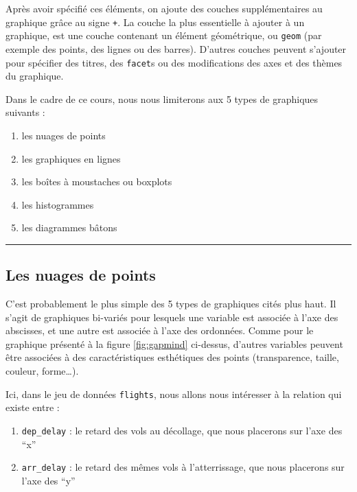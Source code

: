 \documentclass[a4paperpaper,]{article}
\providecommand{\tightlist}{%
  \setlength{\itemsep}{0pt}\setlength{\parskip}{0pt}}
\begin{document}
Après avoir spécifié ces éléments, on ajoute des couches supplémentaires au graphique grâce au signe \texttt{+}. La couche la plus essentielle à ajouter à un graphique, est une couche contenant un élément géométrique, ou \texttt{geom} (par exemple des points, des lignes ou des barres). D'autres couches peuvent s'ajouter pour spécifier des titres, des \texttt{facet}s ou des modifications des axes et des thèmes du graphique.

Dans le cadre de ce cours, nous nous limiterons aux 5 types de graphiques suivants :

\begin{enumerate}
\def\labelenumi{\arabic{enumi}.}
\tightlist
\item
  les nuages de points
\item
  les graphiques en lignes
\item
  les boîtes à moustaches ou boxplots
\item
  les histogrammes
\item
  les diagrammes bâtons
\end{enumerate}

\begin{center}\rule{0.5\linewidth}{\linethickness}\end{center}

\hypertarget{clouds}{%
\subsection{Les nuages de points}\label{clouds}}

C'est probablement le plus simple des 5 types de graphiques cités plus haut. Il s'agit de graphiques bi-variés pour lesquels une variable est associée à l'axe des abscisses, et une autre est associée à l'axe des ordonnées. Comme pour le graphique présenté à la figure \ref{fig:gapmind} ci-dessus, d'autres variables peuvent être associées à des caractéristiques esthétiques des points (transparence, taille, couleur, forme\ldots{}).

Ici, dans le jeu de données \texttt{flights}, nous allons nous intéresser à la relation qui existe entre :

\begin{enumerate}
\def\labelenumi{\arabic{enumi}.}
\tightlist
\item
  \texttt{dep\_delay} : le retard des vols au décollage, que nous placerons sur l'axe des ``x''
\item
  \texttt{arr\_delay} : le retard des mêmes vols à l'atterrissage, que nous placerons sur l'axe des ``y''
\end{enumerate}
\end{document}
